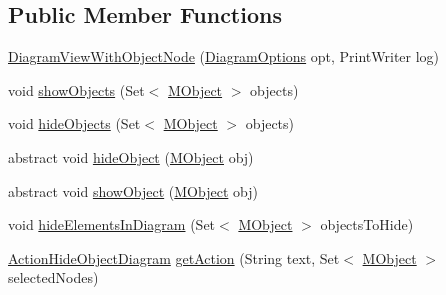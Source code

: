 \subsection*{Public Member Functions}
\begin{DoxyCompactItemize}
\item 
\hyperlink{classorg_1_1tzi_1_1use_1_1gui_1_1views_1_1diagrams_1_1_diagram_view_with_object_node_a7667559fd56c0e0cb1e09e2fe057db78}{Diagram\-View\-With\-Object\-Node} (\hyperlink{classorg_1_1tzi_1_1use_1_1gui_1_1views_1_1diagrams_1_1_diagram_options}{Diagram\-Options} opt, Print\-Writer log)
\item 
void \hyperlink{classorg_1_1tzi_1_1use_1_1gui_1_1views_1_1diagrams_1_1_diagram_view_with_object_node_a9785cb3ba1c6f5cd6a597e93fdbc5052}{show\-Objects} (Set$<$ \hyperlink{interfaceorg_1_1tzi_1_1use_1_1uml_1_1sys_1_1_m_object}{M\-Object} $>$ objects)
\item 
void \hyperlink{classorg_1_1tzi_1_1use_1_1gui_1_1views_1_1diagrams_1_1_diagram_view_with_object_node_ae4db9a4b207a9b7fee83b8b5d290a3c6}{hide\-Objects} (Set$<$ \hyperlink{interfaceorg_1_1tzi_1_1use_1_1uml_1_1sys_1_1_m_object}{M\-Object} $>$ objects)
\item 
abstract void \hyperlink{classorg_1_1tzi_1_1use_1_1gui_1_1views_1_1diagrams_1_1_diagram_view_with_object_node_af68c81981bf3de65ee0d8abf51b6b85d}{hide\-Object} (\hyperlink{interfaceorg_1_1tzi_1_1use_1_1uml_1_1sys_1_1_m_object}{M\-Object} obj)
\item 
abstract void \hyperlink{classorg_1_1tzi_1_1use_1_1gui_1_1views_1_1diagrams_1_1_diagram_view_with_object_node_ab88ad08cf1e658572855761f3e7079d9}{show\-Object} (\hyperlink{interfaceorg_1_1tzi_1_1use_1_1uml_1_1sys_1_1_m_object}{M\-Object} obj)
\item 
void \hyperlink{classorg_1_1tzi_1_1use_1_1gui_1_1views_1_1diagrams_1_1_diagram_view_with_object_node_a9e4ea499a601121f7317ffe4e8f8db38}{hide\-Elements\-In\-Diagram} (Set$<$ \hyperlink{interfaceorg_1_1tzi_1_1use_1_1uml_1_1sys_1_1_m_object}{M\-Object} $>$ objects\-To\-Hide)
\item 
\hyperlink{classorg_1_1tzi_1_1use_1_1gui_1_1views_1_1diagrams_1_1event_1_1_action_hide_object_diagram}{Action\-Hide\-Object\-Diagram} \hyperlink{classorg_1_1tzi_1_1use_1_1gui_1_1views_1_1diagrams_1_1_diagram_view_with_object_node_abb7718985f2c2fb3ff4b42365d078c58}{get\-Action} (String text, Set$<$ \hyperlink{interfaceorg_1_1tzi_1_1use_1_1uml_1_1sys_1_1_m_object}{M\-Object} $>$ selected\-Nodes)
\end{DoxyCompactItemize}
